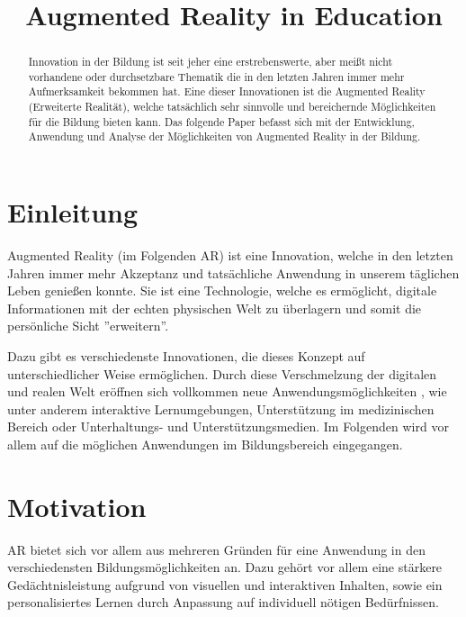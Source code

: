 \documentclass[conference]{IEEEtran}
\begin{document}
\title{Augmented Reality in Education
}

\author{
}
\maketitle

\begin{abstract}
Innovation in der Bildung ist seit jeher eine erstrebenswerte, aber meißt nicht
vorhandene oder durchsetzbare Thematik die in den letzten Jahren immer mehr 
Aufmerksamkeit bekommen hat. Eine dieser Innovationen ist die Augmented Reality
(Erweiterte Realität), welche tatsächlich sehr sinnvolle und bereichernde 
Möglichkeiten für die Bildung bieten kann.
Das folgende Paper befasst sich mit der Entwicklung, 
Anwendung und Analyse der Möglichkeiten von Augmented Reality 
in der Bildung.
\end{abstract}

\section{Einleitung}
Augmented Reality (im Folgenden AR) ist eine Innovation, welche in den letzten
Jahren immer mehr Akzeptanz und tatsächliche Anwendung in unserem täglichen
Leben genießen konnte. Sie ist eine Technologie, welche es ermöglicht, digitale
Informationen mit der echten physischen Welt zu überlagern und somit die persönliche 
Sicht ''erweitern''.

Dazu gibt es verschiedenste Innovationen, die dieses Konzept 
auf unterschiedlicher Weise ermöglichen. Durch diese Verschmelzung
der digitalen und realen Welt eröffnen sich vollkommen neue Anwendungsmöglichkeiten
, wie unter anderem interaktive Lernumgebungen, Unterstützung im medizinischen Bereich
oder Unterhaltungs- und Unterstützungsmedien. Im Folgenden wird vor allem auf die möglichen 
Anwendungen im Bildungsbereich eingegangen.


\section{Motivation}

AR bietet sich vor allem aus mehreren Gründen für eine Anwendung in den verschiedensten
Bildungsmöglichkeiten an. Dazu gehört vor allem eine stärkere Gedächtnisleistung aufgrund von
visuellen und interaktiven Inhalten, sowie ein personalisiertes Lernen durch Anpassung 
auf individuell nötigen Bedürfnissen. \cite{b1} 
\end{document}
